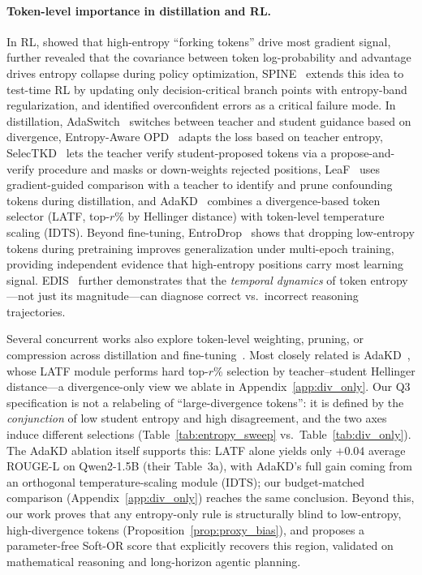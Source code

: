 \documentclass{article}
\begin{document}
\paragraph{Token-level importance in distillation and RL.}
In RL, \citet{wang2025beyond8020} showed that high-entropy ``forking tokens'' drive most gradient signal, \citet{cui2025entropy} further revealed that the covariance between token log-probability and advantage drives entropy collapse during policy optimization, SPINE~\citep{wu2025spine} extends this idea to test-time RL by updating only decision-critical branch points with entropy-band regularization, and \citet{xu2026ace} identified overconfident errors as a critical failure mode.
In distillation, AdaSwitch~\citep{peng2025adaswitch} switches between teacher and student guidance based on divergence, Entropy-Aware OPD~\citep{eopd2026} adapts the loss based on teacher entropy, SelecTKD~\citep{huang2025selectkd} lets the teacher verify student-proposed tokens via a propose-and-verify procedure and masks or down-weights rejected positions, LeaF~\citep{guo2025leaf} uses gradient-guided comparison with a teacher to identify and prune confounding tokens during distillation, and AdaKD~\citep{xie2026adakd} combines a divergence-based token selector (LATF, top-$r$\% by Hellinger distance) with token-level temperature scaling (IDTS).
Beyond fine-tuning, EntroDrop~\citep{wang2025entrodrop} shows that dropping low-entropy tokens during pretraining improves generalization under multi-epoch training, providing independent evidence that high-entropy positions carry most learning signal.
EDIS~\citep{zhu2026edis} further demonstrates that the \emph{temporal dynamics} of token entropy---not just its magnitude---can diagnose correct vs.\ incorrect reasoning trajectories.

Several concurrent works also explore token-level weighting, pruning, or compression across distillation and fine-tuning~\citep{wang2020minilm,tavor2026rethinking,kim2026tsdkd,wang2025winningpruning}.
Most closely related is AdaKD~\citep{xie2026adakd}, whose LATF module performs hard top-$r$\% selection by teacher--student Hellinger distance---a divergence-only view we ablate in Appendix~\ref{app:div_only}.
Our Q3 specification is not a relabeling of ``large-divergence tokens'': it is defined by the \emph{conjunction} of low student entropy and high disagreement, and the two axes induce different selections (Table~\ref{tab:entropy_sweep} vs.\ Table~\ref{tab:div_only}).
The AdaKD ablation itself supports this: LATF alone yields only $+0.04$ average ROUGE-L on Qwen2-1.5B (their Table~3a), with AdaKD's full gain coming from an orthogonal temperature-scaling module (IDTS); our budget-matched comparison (Appendix~\ref{app:div_only}) reaches the same conclusion.
Beyond this, our work proves that any entropy-only rule is structurally blind to low-entropy, high-divergence tokens (Proposition~\ref{prop:proxy_bias}), and proposes a parameter-free Soft-OR score that explicitly recovers this region, validated on mathematical reasoning and long-horizon agentic planning.
\end{document}
